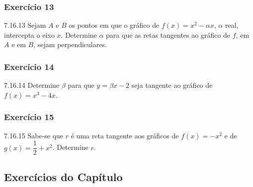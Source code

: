 \subsubsection*{Exercício 13}
\begin{exercicio}[13]{7.16.13}
Sejam $A$ e $B$ os pontos em que o gráfico de $f(x) = x^2 - \alpha x$, $\alpha$ real, intercepta o eixo $x$. Determine $\alpha$ para que as retas tangentes ao gráfico de $f$, em $A$ e em $B$, sejam perpendiculares.
\end{exercicio}

\subsubsection*{Exercício 14}
\begin{exercicio}[14]{7.16.14}
Determine $\beta$ para que $y = \beta x - 2$ seja tangente ao gráfico de $f(x) = x^3 - 4x$.
\end{exercicio}

\subsubsection*{Exercício 15}
\begin{exercicio}[15]{7.16.15}
Sabe-se que $r$ é uma reta tangente aos gráficos de $f(x) = -x^2$ e de $g(x) = \dfrac{1}{2} + x^2$. Determine $r$.
\end{exercicio}

\clearpage

\subsection{Exercícios do Capítulo}

